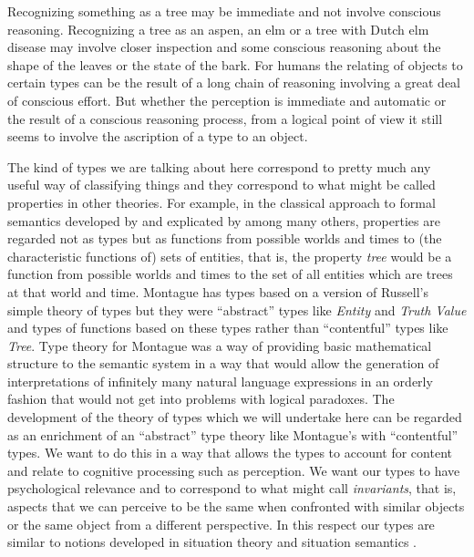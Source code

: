 Recognizing something as a tree may be immediate and not involve
conscious reasoning.  Recognizing a tree as an aspen, an elm or a tree
with Dutch elm disease may involve closer inspection and some conscious
reasoning about the shape of the leaves or the state of the bark.  For
humans the relating of objects to certain types can be the result of a
long chain of reasoning involving a great deal of conscious effort.
But whether the perception is immediate and automatic or the result of
a conscious reasoning process, from a logical point of view it still
seems to involve the ascription of a type to an object.

 

The kind of types we are talking about here correspond to pretty much
any useful way of classifying things and they correspond to what might
be called properties in other theories.  For example, in the classical
approach to formal semantics developed by \cite{Montague1974} and
explicated by \cite{DowtyWallPeters1981} among many others, properties
are regarded not as types but as functions from possible worlds and
times to (the characteristic functions of) sets of entities, that is,
the property \textit{tree} would be a function from possible worlds
and times to the set of all entities which are trees at that world and
time.  Montague has types based on 
a version of Russell's \citeyearpar{Russell1903} simple theory of
types but they were ``abstract'' types like \textit{Entity} and
\textit{Truth Value} and types of functions based on these types
rather than ``contentful'' types like \textit{Tree}.  Type
theory for Montague was a way of providing basic mathematical
structure to the semantic system in a way that would allow the
generation of interpretations of infinitely many natural language
expressions in an orderly fashion that would not get into
problems with logical paradoxes.  The development of the theory of types which
we will undertake here can be regarded as an enrichment of an
``abstract'' type theory like Montague's with ``contentful'' types.
We want to do this in a way that allows the
types to account for content and relate to cognitive processing such
as perception.  We want our types to have psychological relevance and
to correspond to what \cite{Gibson1979} might call
\textit{invariants}, that is, aspects that we can perceive to be the
same when confronted with similar objects or the same object from a
different perspective.  In this respect our types are similar to
notions developed in situation theory and situation semantics
\citep{BarwisePerry1983,Barwise1989}.

